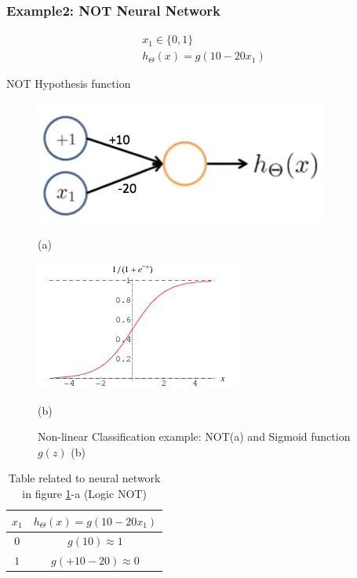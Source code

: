 \newpage
\begin{mdframed}[style=MyFrame]
\subsubsection{ Example2:  NOT Neural Network}

\begin{eqfloat}[H]
\begin{equation}
\begin{aligned}
x_1 \in \{0,1\} \\
h_{\Theta}(x) = g(10 - 20x_1) 
\end{aligned}
\end{equation}
      \addtocounter{equation}{-1}
        \caption{  NOT Hypothesis function}
        \label{eq:nothyp}
    \end{eqfloat}


\begin{figure}[H]
	\centering
	\begin{minipage}[c]{.43\textwidth}
		\centering
		\includegraphics[scale=0.45]{images/not}
		\caption*{(a)}
	\end{minipage}%
	\hspace{4mm}%
	\begin{minipage}[c]{.43\textwidth}
		\centering
		\includegraphics[scale=0.50]{images/sigmoidplot}
		\caption*{(b)}
	\end{minipage}
	\caption{Non-linear Classification example: NOT(a) and Sigmoid function $g(z)$ (b)}\label{fig:not}
\end{figure}


\begin{table}[H]
\caption{Table related to neural network in figure \ref{fig:not}-a (Logic NOT) }
\centering
\begin{tabular}{c c }
\hline\hline
$x_1$	&  $h_{\Theta}(x) = g(10 - 20x_1 )$  \\ [0.5ex] %
\hline
$0$ 	& $g(10) \approx 1$ \\
$1$ 	& $g(+10 - 20) \approx 0$ \\
\hline
\end{tabular}
\label{table:nov-ser}
\end{table}

\end{mdframed}


